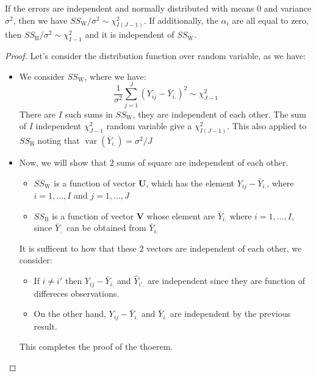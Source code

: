 \begin{theorem}
    If the errors are independent and normally distributed with means $0$ and variance $\sigma^2$, then we have $SS_\text{W}/\sigma^2 \sim \chi^2_{I(J-1)}$. If additionally, the $\alpha_i$ are all equal to zero, then $SS_\text{B}/\sigma^2 \sim \chi^2_{I-1}$ and it is independent of $SS_\text{W}$.
\end{theorem}
\begin{proof}
    Let's consider the distribution function over random variable, as we have:
    \begin{itemize}
        \item We consider $SS_\text{W}$, where we have:
        \begin{equation*}
            \frac{1}{\sigma^2}\sum^J_{j=1}(Y_{ij}-\bar{Y}_{i.})^2 \sim \chi^2_{J-1}
        \end{equation*}
        There are $I$ such sums in $SS_\text{W}$, they are independent of each other. The sum of $I$ independent $\chi^2_{J-1}$ random variable give a $\chi^2_{I(J-1)}$. This also applied to $SS_\text{B}$ noting that $\operatorname{var}(\bar{Y}_{i.}) =\sigma^2/J$
        \item Now, we will show that $2$ sums of square are independent of each other. 
        \begin{itemize}
            \item $SS_\text{W}$ is a function of vector $\boldsymbol U$, which has the element $Y_{ij} - \bar{Y}_{i.}$, where $i=1,\dots,I$ and $j=1,\dots,J$
            \item $SS_\text{B}$ is a function of vector $\boldsymbol V$ whose element are $\bar{Y}_{i.}$ where $i=1,\dots,I$, since $\bar{Y}_{..}$ can be obtained from $\bar{Y}_{i.}$
        \end{itemize}
        It is sufficent to how that these $2$ vectors are independent of each other, we consider:
        \begin{itemize}
            \item If $i\ne i'$ then $Y_{ij} - \bar{Y}_{i.}$ and $\hat{Y}_{i'.}$ are independent since they are function of differeces observations. 
            \item On the other hand, $Y_{ij} - \bar{Y}_{i.}$ and $\bar{Y}_{i.}$ are independent by the previous result.
        \end{itemize}
        This completes the proof of the thoerem.
    \end{itemize}
\end{proof}

